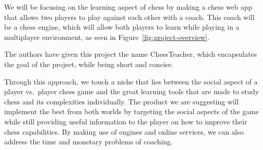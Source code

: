 We will be focusing on the learning aspect of chess by making a chess web app that allows two players to play against
each other with a coach.
This coach will be a chess engine, which will allow both players to learn while playing in a multiplayer environment, as
seen in Figure~\ref{fig:project-overview}.

The authors have given this project the name ChessTeacher, which encapsulates the goal of the project, while being
short and concise.

Through this approach, we touch a niche that lies between the social aspect of a player vs.\ player chess game and the
great learning tools that are made to study chess and its complexities individually.
The product we are suggesting will implement the best from both worlds by targeting the social aspects of the game while
still providing useful information to the player on how to improve their chess capabilities.
By making use of engines and online services, we can also address the time and monetary problems of coaching.
